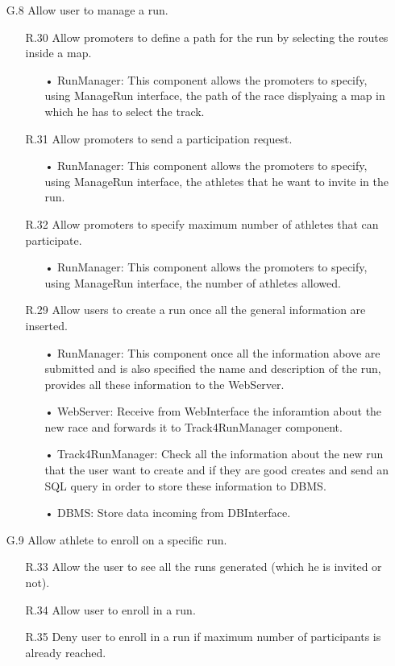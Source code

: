 \begin{enumerate}
\item [G.8] Allow user to manage a run.
	\begin{enumerate}
	\item [R.30] Allow promoters to define a path for the run by selecting the routes inside a map.
		\begin{enumerate}
		\item[•] RunManager: This component allows the promoters to specify, using ManageRun interface, the path of the race displyaing a map in which he has to select the track.
		\end{enumerate}	
	\item [R.31] Allow promoters to send a participation request.
		\begin{enumerate}
		\item[•] RunManager: This component allows the promoters to specify, using ManageRun interface, the athletes that he want to invite in the run.
		\end{enumerate}	
	\item [R.32] Allow promoters to specify maximum number of athletes that can participate.
		\begin{enumerate}
		\item[•] RunManager: This component allows the promoters to specify, using ManageRun interface, the number of athletes allowed.
		\end{enumerate}	
	\item [R.29] Allow users to create a run once all the general information are inserted.
		\begin{enumerate}
		\item[•] RunManager: This component once all the information above are submitted and is also specified the name and description of the run, provides all these information to the WebServer.
		\item[•] WebServer: Receive from WebInterface the inforamtion about the new race and forwards it to Track4RunManager component.
		\item[•] Track4RunManager: Check all the information about the new run that the user want to create and if they are good creates and send an SQL query in order to store these information to DBMS.
		\item[•] DBMS: Store data incoming from DBInterface.
		\end{enumerate}	
	\end{enumerate}	
	
\item [G.9] Allow athlete to enroll on a specific run.
	\begin{enumerate}
	\item [R.33] Allow the user to see all the runs generated (which he is invited or not).
	\item [R.34] Allow user to enroll in a run.
	\item [R.35] Deny user to enroll in a run if maximum number of participants is already reached.

	\end{enumerate}
	
\end{enumerate}